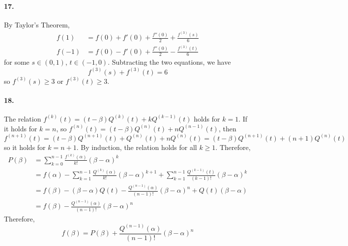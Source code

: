\documentclass[a4paper]{article}
\begin{document}
\paragraph{17.}
By Taylor's Theorem,
\begin{equation*}
    \begin{split}
        f(1) & =f(0)+f'(0)+\frac{f''(0)}{2}+\frac{f^{(3)}(s)}{6}\\
        f(-1) & =f(0)-f'(0)+\frac{f''(0)}{2}-\frac{f^{(3)}(t)}{6}
    \end{split}
\end{equation*}
for some $s\in(0,1)$,\; $t\in(-1,0)$. Subtracting the two equations, we have
\[
f^{(3)}(s)+f^{(3)}(t)=6
\]
so $f^{(3)}(s)\geq3$ or $f^{(3)}(t)\geq3$.

\paragraph{18.}
The relation $f^{(k)}(t)=(t-\beta)Q^{(k)}(t)+kQ^{(k-1)}(t)$ holds for $k=1$. If it holds for $k=n$, so $f^{(n)}(t)=(t-\beta)Q^{(n)}(t)+nQ^{(n-1)}(t)$, then
\[
f^{(n+1)}(t)=(t-\beta)Q^{(n+1)}(t)+Q^{(n)}(t)+nQ^{(n)}(t)=(t-\beta)Q^{(n+1)}(t)+(n+1)Q^{(n)}(t)
\]
so it holds for $k=n+1$. By induction, the relation holds for all $k\geq1$. Therefore,
\begin{equation*}
    \begin{split}
        P(\beta) & =\sum_{k=0}^{n-1}\frac{f^{(k)}(\alpha)}{k!}(\beta-\alpha)^k\\
        & =f(\alpha)-\sum_{k=1}^{n-1}\frac{Q^{(k)}(\alpha)}{k!}(\beta-\alpha)^{k+1}+\sum_{k=1}^{n-1}\frac{Q^{(k-1)}(t)}{(k-1)!}(\beta-\alpha)^k\\
        & =f(\beta)-(\beta-\alpha)Q(t)-\frac{Q^{(n-1)}(\alpha)}{(n-1)!}(\beta-\alpha)^n+Q(t)(\beta-\alpha)\\
        & =f(\beta)-\frac{Q^{(n-1)}(\alpha)}{(n-1)!}(\beta-\alpha)^n
    \end{split}
\end{equation*}
Therefore,
\[
f(\beta)=P(\beta)+\frac{Q^{(n-1)}(\alpha)}{(n-1)!}(\beta-\alpha)^n
\]
\end{document}
